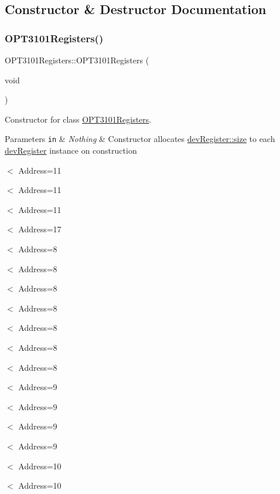 \subsection{Constructor \& Destructor Documentation}
\mbox{\label{class_o_p_t3101_registers_a2a1e1326298b4b07e7c922ccc0ac0d85}} 
\subsubsection{\texorpdfstring{O\+P\+T3101\+Registers()}{OPT3101Registers()}}
{\footnotesize\ttfamily O\+P\+T3101\+Registers\+::\+O\+P\+T3101\+Registers (\begin{DoxyParamCaption}\item[{void}]{ }\end{DoxyParamCaption})}



Constructor for class \mbox{\hyperlink{class_o_p_t3101_registers}{O\+P\+T3101\+Registers}}. 


\begin{DoxyParams}[1]{Parameters}
\mbox{\tt in}  & {\em Nothing} & Constructor allocates \mbox{\hyperlink{classdev_register_a6596e86ccbcd857febb5c28bc03aa480}{dev\+Register\+::size}} to each \mbox{\hyperlink{classdev_register}{dev\+Register}} instance on construction \\
\hline
\end{DoxyParams}
$<$ Address=11

$<$ Address=11

$<$ Address=11

$<$ Address=17

$<$ Address=8

$<$ Address=8

$<$ Address=8

$<$ Address=8

$<$ Address=8

$<$ Address=8

$<$ Address=8

$<$ Address=9

$<$ Address=9

$<$ Address=9

$<$ Address=9

$<$ Address=10

$<$ Address=10

